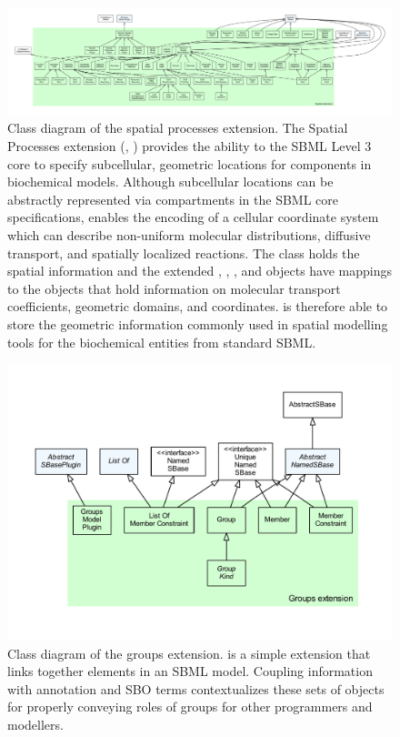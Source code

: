\begin{figure}[hb]
 \centering
 \vspace*{2ex}
 \includegraphics[width=\textwidth]{../../../extensions/spatial/doc/img/type_hierarchy.pdf}
 \caption[Class diagram of the spatial processes extension]{Class diagram of the spatial processes extension. The Spatial Processes extension (, \cite{Schaff2014})
provides the ability to the SBML Level 3 core to specify subcellular,
geometric locations for components in biochemical
models. Although subcellular locations can be abstractly represented via
compartments in the SBML core specifications,  enables the encoding of
a cellular coordinate system which can describe non-uniform molecular distributions,
diffusive transport, and spatially localized reactions. The  class holds
the spatial information and the extended , , , and
 objects have mappings to the  objects that hold information on
molecular transport coefficients, geometric domains, and coordinates.  is
therefore able to store the geometric information commonly used in spatial modelling
tools for the biochemical entities from standard SBML.}
 \label{fig:spatial}
\end{figure}

\begin{figure}[hb]
 \centering
 \vspace*{2ex}
 \includegraphics[width=\textwidth]{../../../extensions/groups/doc/img/type_hierarchy.pdf}
 \caption[Class diagram of the groups extension]{Class diagram of the groups extension.  is a simple extension that links together elements in an SBML model. Coupling
 information with annotation and SBO terms \cite{Courtot2011a} 
contextualizes these sets of objects for properly conveying roles of groups 
for other programmers and modellers.}
 \label{fig:groups}
\end{figure}


